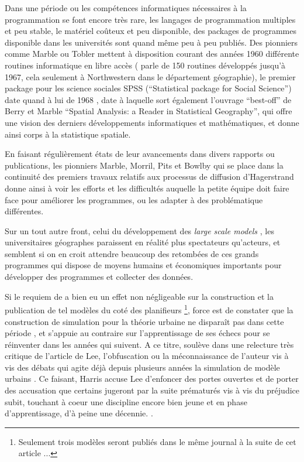 {Dans une période ou les compétences informatiques nécessaires à la programmation se font encore très rare, les langages de programmation multiples et peu stable, le matériel coûteux et peu disponible, des packages de programmes disponible dans les universités sont quand même peu à peu publiés. Des pionniers comme Marble ou Tobler mettent à disposition courant des années 1960 différente routines informatique en libre accès \autocite{Haggett1969}  (\textcite[3]{Marble1967} parle de 150 routines développés jusqu'à 1967, cela seulement à Northwestern dans le département géographie), le premier package pour les science sociales SPSS (\foreignquote{english}{Statistical package for Social Science}) date quand à lui de 1968 \autocite{Barnes2011} , date à laquelle sort également l'ouvrage \foreignquote{english}{best-off} de Berry et Marble \foreignquote{english}{Spatial Analysis: a Reader in Statistical Geography}, qui offre une vision des derniers développements informatiques et mathématiques, et donne ainsi corps à la statistique spatiale. 

En faisant régulièrement états de leur avancements dans divers rapports ou publications, les pionniers Marble, Morril, Pits et Bowlby \autocite{Pitts1963} qui se place dans la continuité des premiers travaux relatifs aux processus de diffusion d'Hagerstrand \autocite{Hagerstrand1953, Hagerstrand1967a} donne ainsi à voir les efforts et les difficultés auquelle la petite équipe doit faire face pour améliorer les programmes, ou les adapter à des problématique différentes.

Sur un tout autre front, celui du développement des \textit{large scale models} \autocite[8]{Batty1976} \autocite[11]{Batty1994}, les universitaires géographes paraissent en réalité plus spectateurs qu'acteurs, et semblent si on en croit \textcite{Haggett1969} attendre beaucoup des retombées de ces grands programmes  qui dispose de moyens humains et économiques importants pour développer des programmes et collecter des données.

Si le requiem de \textcite{Lee1973} a bien eu un effet non négligeable sur la construction et la publication de tel modèles du coté des planifieurs \footnote{Seulement trois modèles seront publiés dans le même journal à la suite de cet article ...}, force est de constater que la construction de simulation pour la théorie urbaine ne disparaît pas dans cette période \autocite[11-12]{Batty1994}, et s'appuie au contraire sur l'apprentissage de ses échecs pour se réinventer dans les années qui suivent. A ce titre, \textcite{Harris1994} soulève dans une relecture très critique de l'article de Lee, l'obfuscation ou la méconnaissance de l'auteur vis à vis des débats qui agite déjà depuis plusieurs années la simulation de modèle urbains \autocite{Wilson1970, Orcutt1957, Harris1968}. Ce faisant, Harris accuse Lee d'enfoncer des portes ouvertes et de porter des accusation que certains jugeront par la suite prématurés vis à vis du préjudice subit, touchant à coeur une discipline encore bien jeune et en phase d'apprentissage, d'à peine une décennie. \autocite[p11]{Batty1994}.

}
